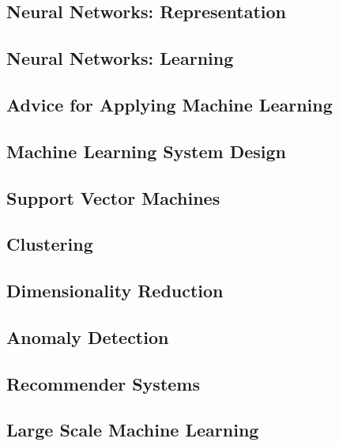 \documentclass[english, 11pt]{article}
\begin{document}
	\subsection{Neural Networks: Representation}
	

	\subsection{Neural Networks: Learning}
	

	\subsection{Advice for Applying Machine Learning}
	

	\subsection{Machine Learning System Design}
	

	\subsection{Support Vector Machines}
	

	\subsection{Clustering}
	

	\subsection{Dimensionality Reduction}
	

	\subsection{Anomaly Detection}
	

	\subsection{Recommender Systems}
	

	\subsection{Large Scale Machine Learning}
	
\end{document}
